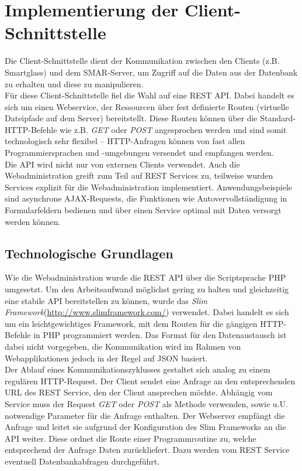 \chapter{Implementierung der Client-Schnittstelle}
\label{cha:impl_api}

Die Client-Schnittstelle dient der Kommunikation zwischen den Clients (z.B. Smartglass) und dem \acs{SMAR}-Server, um Zugriff auf die Daten aus der Datenbank zu erhalten und diese zu manipulieren.\\

Für diese Client-Schnittstelle fiel die Wahl auf eine \acs{REST} \acs{API}. Dabei handelt es sich um einen Webservice, der Ressourcen über fest definierte Routen (virtuelle Dateipfade auf dem Server) bereitstellt. Diese Routen können über die Standard-\acs{HTTP}-Befehle wie z.B. \emph{GET} oder \emph{POST} angesprochen werden und sind somit technologisch sehr flexibel -- \acs{HTTP}-Anfragen können von fast allen Programmiersprachen und -umgebungen versendet und empfangen werden.\\

Die \acs{API} wird nicht nur von externen Clients verwendet. Auch die Webadministration greift zum Teil auf \acs{REST} Services zu, teilweise wurden Services explizit für die Webadministration implementiert. Anwendungsbeispiele sind asynchrone \acs{AJAX}-Requests, die Funktionen wie Autovervollständigung in Formularfeldern bedienen und über einen Service optimal mit Daten versorgt werden können.

\section{Technologische Grundlagen}
Wie die Webadministration wurde die \acs{REST} \acs{API} über die Scriptsprache \acs{PHP} umgesetzt. Um den Arbeitsaufwand möglichst gering zu halten und gleichzeitig eine stabile API bereitstellen zu können, wurde das \emph{Slim Framework}(\url{http://www.slimframework.com/}) verwendet. Dabei handelt es sich um ein leichtgewichtiges Framework, mit dem Routen für die gängigen \acs{HTTP}-Befehle in \acs{PHP} programmiert werden. Das Format für den Datenaustausch ist dabei nicht vorgegeben, die Kommunikation wird im Rahmen von Webapplikationen jedoch in der Regel auf JSON basiert.\\

Der Ablauf eines Kommunikationszyklusses gestaltet sich analog zu einem regulären \acs{HTTP}-Request. Der Client sendet eine Anfrage an den entsprechenden \acs{URL} des \acs{REST} Service, den der Client ansprechen möchte. Abhängig vom Service muss der Request \emph{GET} oder \emph{POST} als Methode verwenden, sowie u.U. notwendige Parameter für die Anfrage enthalten. Der Webserver empfängt die Anfrage und leitet sie aufgrund der Konfiguration des Slim Frameworks an die \acs{API} weiter. Diese ordnet die Route einer Programmroutine zu, welche entsprechend der Anfrage Daten zurückliefert. Dazu werden vom REST Service eventuell Datenbankabfragen durchgeführt.

